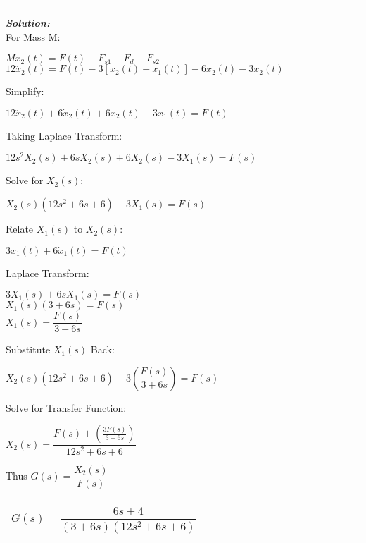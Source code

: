 \documentclass[11pt,letterpaper]{article}
\begin{document}
\rule{\textwidth}{1pt}
\vspace{12pt}
\textit{\textbf{Solution:}}\\
For Mass M:\\
\begin{center}
	$M\ddot{x}_2(t)=F(t)-F_{s1}-F_d-F_{s2}$\\[12pt]
	$12\ddot{x}_2(t)=F(t)-3[x_2(t)-x_1(t)]-6\dot{x}_2(t)-3x_2(t)$\\
\end{center}
Simplify:\\
\begin{center}
	$12\ddot{x}_2(t)+6\dot{x}_2(t)+6x_2(t)-3x_1(t)=F(t)$\\
\end{center}
Taking Laplace Transform:\\
\begin{center}
	$12s^2X_2(s)+6sX_2(s)+6X_2(s)-3X_1(s)=F(s)$\\
\end{center}
Solve for $X_2(s)$:\\
\begin{center}
	$X_2(s)(12s^2+6s+6)-3X_1(s)=F(s)$
\end{center}
Relate $X_1(s)$ to $X_2(s)$:\\
\begin{center}
	$3x_1(t)+6\dot{x}_1(t)=F(t)$\\
\end{center}
Laplace Transform:\\
\begin{center}
	$3X_1(s)+6sX_1(s)=F(s)$\\[12pt]
	$X_1(s)(3+6s)=F(s)$\\[12pt]
	$X_1(s)=\dfrac{F(s)}{3+6s}$\\
\end{center}
Substitute $X_1(s)$ Back:\\
\begin{center}
	$X_2(s)(12s^2+6s+6)-3\left(\dfrac{F(s)}{3+6s}\right)=F(s)$\\
\end{center}
Solve for Transfer Function:\\
\begin{center}
	$X_2(s)=\dfrac{F(s)+\left(\frac{3F(s)}{3+6s}\right)}{12s^2+6s+6}$\\[12pt]
\end{center}
Thus $G(s)=\dfrac{X_2(s)}{F(s)}$\\
\begin{center}
	\begin{tabular}{|c|}
		\hline \\
		$G(s)=\dfrac{6s+4}{(3+6s)(12s^2+6s+6)}$\\[12pt]
		\hline
	\end{tabular}	
\end{center}
\end{document}
